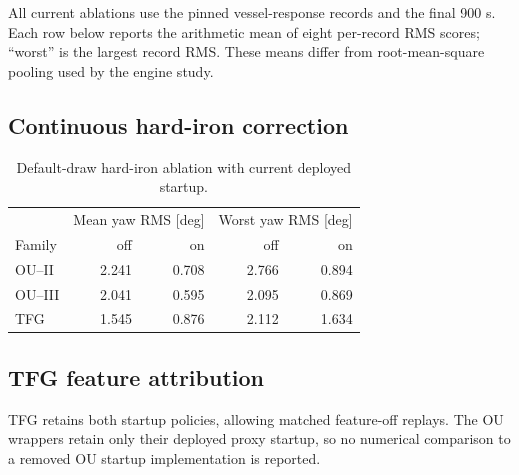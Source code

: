 All current ablations use the pinned vessel-response records and the
final 900 s. Each row below reports the arithmetic mean of eight per-record
RMS scores; ``worst'' is the largest record RMS. These means differ from
root-mean-square pooling used by the engine study.

\subsection{Continuous hard-iron correction}
\begin{table}[t]\centering
\caption{Default-draw hard-iron ablation with current deployed startup.}
\label{tab:startup-hardiron}\footnotesize
\begin{tabular}{@{}lrrrr@{}}\toprule
& \multicolumn{2}{c}{Mean yaw RMS [deg]} & \multicolumn{2}{c}{Worst yaw RMS [deg]} \\
Family & off & on & off & on \\
\midrule
OU--II & 2.241 & 0.708 & 2.766 & 0.894 \\
OU--III & 2.041 & 0.595 & 2.095 & 0.869 \\
TFG & 1.545 & 0.876 & 2.112 & 1.634 \\
\bottomrule\end{tabular}\end{table}

\subsection{TFG feature attribution}
TFG retains both startup policies, allowing matched feature-off replays.
The OU wrappers retain only their deployed proxy startup, so no numerical
comparison to a removed OU startup implementation is reported.
\begin{table}[t]\centering
\caption{TFG default-draw feature ablations. Bias is mean accelerometer-bias RMS.}
\label{tab:tfg-ablation}\footnotesize
{}\end{table}

